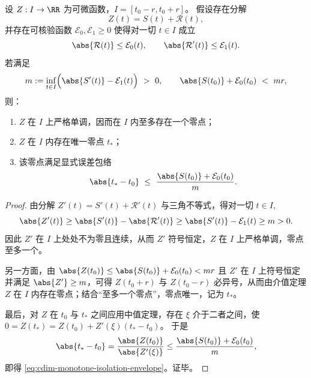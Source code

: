 \begin{theorem}[带余项控制的单调隔离与零点局部唯一性]\label{thm:cdim-monotone-isolation-unique-zero}
设 \(Z:I\to\RR\) 为可微函数，\(I=[t_0-r,t_0+r]\)。
假设存在分解
\[
Z(t)=S(t)+\mathcal{R}(t),
\]
并存在可核验函数 \(\mathcal{E}_0,\mathcal{E}_1\ge 0\) 使得对一切 \(t\in I\) 成立
\[
\abs{\mathcal{R}(t)}\le \mathcal{E}_0(t),
\qquad
\abs{\mathcal{R}'(t)}\le \mathcal{E}_1(t).
\]
若满足
\[
m:=\inf_{t\in I}\Bigl(\abs{S'(t)}-\mathcal{E}_1(t)\Bigr)\ >\ 0,
\qquad
\abs{S(t_0)}+\mathcal{E}_0(t_0)\ <\ mr,
\]
则：
\begin{enumerate}
  \item \(Z\) 在 \(I\) 上严格单调，因而在 \(I\) 内至多存在一个零点；
  \item \(Z\) 在 \(I\) 内存在唯一零点 \(t_\ast\)；
  \item 该零点满足显式误差包络
  \begin{equation}\label{eq:cdim-monotone-isolation-envelope}
  \abs{t_\ast-t_0}\ \le\ \frac{\abs{S(t_0)}+\mathcal{E}_0(t_0)}{m}.
  \end{equation}
\end{enumerate}
\end{theorem}
\begin{proof}
由分解 \(Z'(t)=S'(t)+\mathcal{R}'(t)\) 与三角不等式，得对一切 \(t\in I\),
\[
\abs{Z'(t)}\ge \abs{S'(t)}-\abs{\mathcal{R}'(t)}\ge \abs{S'(t)}-\mathcal{E}_1(t)\ge m>0.
\]
因此 \(Z'\) 在 \(I\) 上处处不为零且连续，从而 \(Z'\) 符号恒定，\(Z\) 在 \(I\) 上严格单调，零点至多一个。
\par
另一方面，由 \(\abs{Z(t_0)}\le \abs{S(t_0)}+\mathcal{E}_0(t_0)<mr\) 且 \(Z'\) 在 \(I\) 上符号恒定并满足 \(\abs{Z'}\ge m\)，可得
\(
Z(t_0+r)
\)
与
\(
Z(t_0-r)
\)
必异号，从而由介值定理 \(Z\) 在 \(I\) 内存在零点；结合“至多一个零点”，零点唯一，记为 \(t_\ast\)。
\par
最后，对 \(Z\) 在 \(t_0\) 与 \(t_\ast\) 之间应用中值定理，存在 \(\xi\) 介于二者之间，使
\(
0=Z(t_\ast)=Z(t_0)+Z'(\xi)(t_\ast-t_0)
\)。
于是
\[
\abs{t_\ast-t_0}=\frac{\abs{Z(t_0)}}{\abs{Z'(\xi)}}
\le \frac{\abs{S(t_0)}+\mathcal{E}_0(t_0)}{m},
\]
即得 \eqref{eq:cdim-monotone-isolation-envelope}。证毕。
\end{proof}

